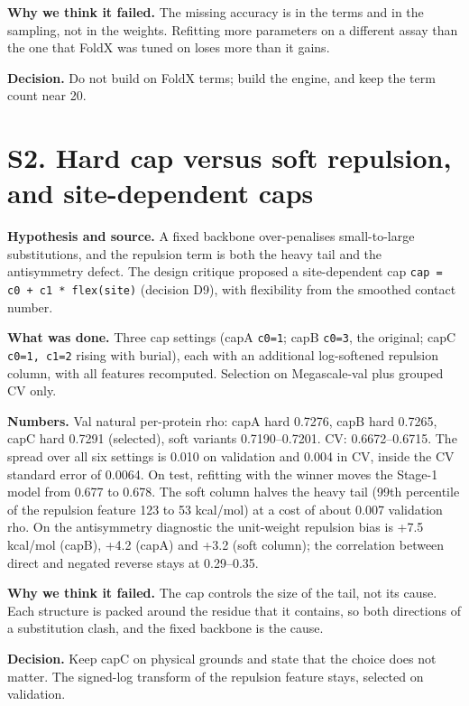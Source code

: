 \documentclass[11pt,a4paper]{article}
\begin{document}
\textbf{Why we think it failed.} The missing accuracy is in the terms and in the sampling, not in the weights.
Refitting more parameters on a different assay than the one that FoldX was tuned on loses more than it gains.

\textbf{Decision.} Do not build on FoldX terms; build the engine, and keep the term count near 20.



\section{S2. Hard cap versus soft repulsion, and site-dependent caps}

\textbf{Hypothesis and source.} A fixed backbone over-penalises small-to-large substitutions, and the repulsion term
is both the heavy tail and the antisymmetry defect. The design critique proposed a site-dependent cap
\texttt{cap = c0 + c1 * flex(site)} (decision D9), with flexibility from the smoothed contact number.

\textbf{What was done.} Three cap settings (capA \texttt{c0=1}; capB \texttt{c0=3}, the original; capC \texttt{c0=1, c1=2} rising with
burial), each with an additional log-softened repulsion column, with all features recomputed. Selection on
Megascale-val plus grouped CV only.

\textbf{Numbers.} Val natural per-protein rho: capA hard 0.7276, capB hard 0.7265, capC hard 0.7291 (selected),
soft variants 0.7190--0.7201. CV: 0.6672--0.6715. The spread over all six settings is 0.010 on validation and
0.004 in CV, inside the CV standard error of 0.0064. On test, refitting with the winner moves the Stage-1 model
from 0.677 to 0.678. The soft column halves the heavy tail (99th percentile of the repulsion feature 123 to 53
kcal/mol) at a cost of about 0.007 validation rho. On the antisymmetry diagnostic the unit-weight repulsion bias
is +7.5 kcal/mol (capB), +4.2 (capA) and +3.2 (soft column); the correlation between direct and negated reverse
stays at 0.29--0.35.

\textbf{Why we think it failed.} The cap controls the size of the tail, not its cause. Each structure is packed
around the residue that it contains, so both directions of a substitution clash, and the fixed backbone is the cause.

\textbf{Decision.} Keep capC on physical grounds and state that the choice does not matter. The signed-log transform
of the repulsion feature stays, selected on validation.
\end{document}
